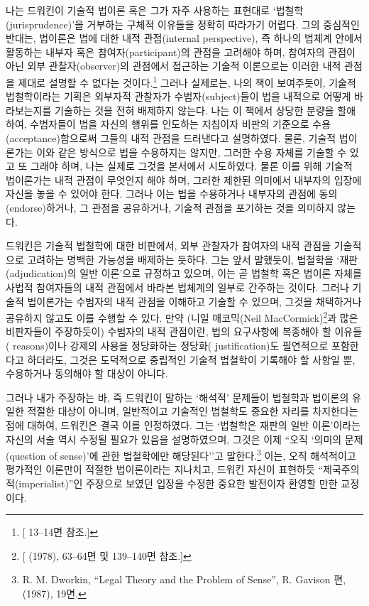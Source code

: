 나는 드워킨이 기술적 법이론 혹은 그가 자주 사용하는 표현대로
`법철학(jurisprudence)'을 거부하는 구체적 이유들을 정확히 따라가기
어렵다. 그의 중심적인 반대는, 법이론은 법에 대한 내적 관점(internal
perspective), 즉 하나의 법체계 안에서 활동하는 내부자 혹은
참여자(participant)의 관점을 고려해야 하며, 참여자의 관점이 아닌 외부
관찰자(observer)의 관점에서 접근하는 기술적 이론으로는 이러한 내적
관점을 제대로 설명할 수 없다는 것이다.\footnote{{[} 13--14면
  참조.{]}} 그러나 실제로는, 나의 책이 보여주듯이, 기술적 법철학이라는
기획은 외부자적 관찰자가 수범자(subject)들이 법을 내적으로 어떻게
바라보는지를 기술하는 것을 전혀 배제하지 않는다. 나는 이 책에서 상당한
분량을 할애하여, 수범자들이 법을 자신의 행위를 인도하는 지침이자 비판의
기준으로 수용(acceptance)함으로써 그들의 내적 관점을 드러낸다고
설명하였다. 물론, 기술적 법이론가는 이와 같은 방식으로 법을 수용하지는
않지만, 그러한 수용 자체를 기술할 수 있고 또 그래야 하며, 나는 실제로
그것을 본서에서 시도하였다. 물론 이를 위해 기술적 법이론가는 내적 관점이
무엇인지 해야 하며, 그러한 제한된 의미에서
내부자의 입장에 자신을 놓을 수 있어야 한다. 그러나 이는 법을 수용하거나
내부자의 관점에 동의(endorse)하거나, 그 관점을 공유하거나, 기술적 관점을
포기하는 것을 의미하지 않는다.

드워킨은 기술적 법철학에 대한 비판에서, 외부 관찰자가 참여자의 내적
관점을 기술적으로 고려하는 명백한 가능성을 배제하는 듯하다. 그는 앞서
말했듯이, 법철학을 `재판(adjudication)의 일반 이론'으로 규정하고 있으며,
이는 곧 법철학 혹은 법이론 자체를 사법적 참여자들의 내적 관점에서 바라본
법체계의 일부로 간주하는 것이다. 그러나 기술적 법이론가는 수범자의 내적
관점을 이해하고 기술할 수 있으며, 그것을 채택하거나 공유하지 않고도 이를
수행할 수 있다. 만약 (니일 매코믹(Neil MacCormick)\footnote{{[} (1978), 63--64면 및 139--140면 참조.{]}}과
많은 비판자들이 주장하듯이) 수범자의 내적 관점이란, 법의 요구사항에
복종해야 할  이유들( reasons)이나 강제의 사용을
정당화하는  정당화( justification)도 필연적으로
포함한다고 하더라도, 그것은 도덕적으로 중립적인 기술적 법철학이 기록해야
할 사항일 뿐, 수용하거나 동의해야 할 대상이 아니다.

그러나 내가 주장하는 바, 즉 드워킨이 말하는 `해석적' 문제들이 법철학과
법이론의 유일한 적절한 대상이 아니며, 일반적이고 기술적인 법철학도
중요한 자리를 차지한다는 점에 대하여, 드워킨은 결국 이를 인정하였다.
그는 `법철학은 재판의 일반 이론'이라는 자신의 서술 역시 수정될 필요가
있음을 설명하였으며, 그것은 이제 ``오직 `의미의 문제(question of
sense)'에 관한 법철학에만 해당된다''고 말한다.\footnote{R. M. Dworkin,
  ``Legal Theory and the Problem of Sense'', R. Gavison 편, 
  (1987), 19면.} 이는, 오직 해석적이고 평가적인 이론만이 적절한
법이론이라는 지나치고, 드워킨 자신이 표현하듯
``제국주의적(imperialist)''인 주장으로 보였던 입장을 수정한 중요한
발전이자 환영할 만한 교정이다.


